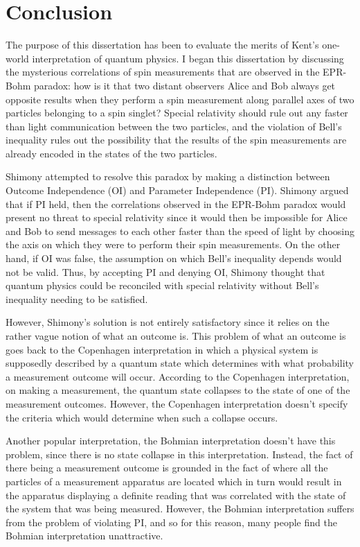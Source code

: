 \chapter*{Conclusion}
The purpose of this dissertation has been to evaluate the merits of Kent's one-world interpretation of quantum physics. I began this dissertation by discussing the mysterious correlations of spin measurements that are observed in the EPR-Bohm paradox: how is it that two distant observers Alice and Bob always get opposite results when they perform a spin measurement along parallel axes of two particles belonging to a spin singlet? Special relativity should rule out any faster than light communication between the two particles, and the violation of Bell's inequality rules out the possibility that the results of the spin measurements are already encoded in the states of the two particles.
 
Shimony attempted to resolve this paradox by making a distinction between Outcome Independence (OI) and Parameter Independence (PI). Shimony argued that if PI held, then the correlations observed in the EPR-Bohm paradox would present no threat to special relativity since it would then be impossible for Alice and Bob to send messages to each other faster than the speed of light by choosing the axis on which they were to perform their spin measurements. On the other hand, if OI was false, the assumption on which Bell's inequality depends would not be valid. Thus, by accepting PI and denying OI, Shimony thought that quantum physics could be reconciled with special relativity without Bell's inequality needing to be satisfied. 

However, Shimony's solution is not entirely satisfactory since it relies on the rather vague notion of what an outcome is. This problem of what an outcome is goes back to the Copenhagen interpretation in which a physical system is supposedly described by a quantum state which determines with what probability a measurement outcome will occur. According to the Copenhagen interpretation, on making a measurement, the quantum state collapses to the state of one of the measurement outcomes. However, the Copenhagen interpretation doesn't specify the criteria which would determine when such a collapse occurs. 

Another popular interpretation, the Bohmian interpretation doesn't have this problem, since there is no state collapse in this interpretation. Instead, the fact of there being a measurement outcome is grounded in the fact of where all the particles of a measurement apparatus are located which in turn would result in the apparatus displaying a definite reading that was correlated with the state of the system that was being measured.  However, the Bohmian interpretation suffers from the problem of violating PI, and so for this reason, many people find the Bohmian interpretation unattractive. 

